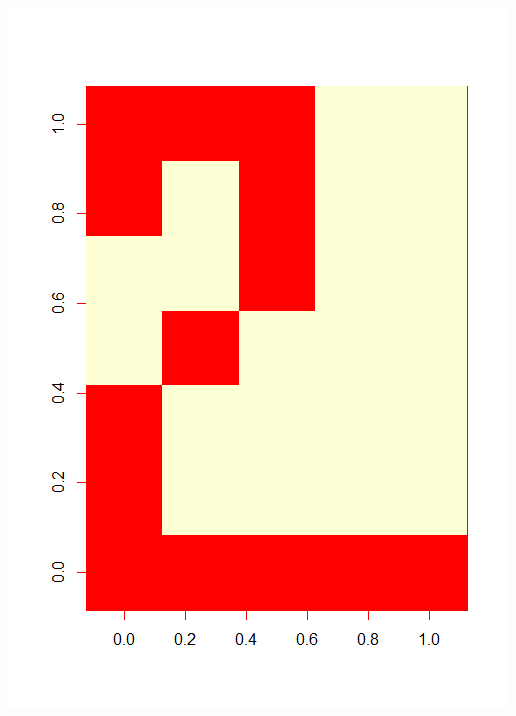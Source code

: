 \begin{minipage}{0.2\linewidth}
\includegraphics[width = \textwidth]{Figures/data2}

\end{minipage}
